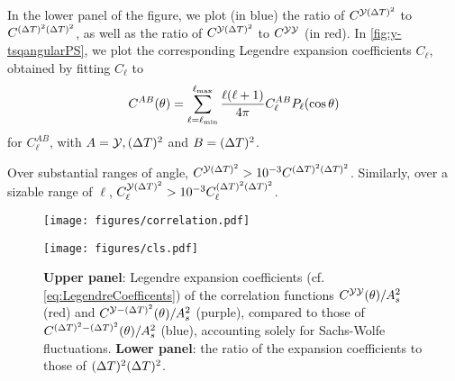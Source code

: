 \documentclass[fleqn,usenatbib]{mnras}
\begin{document}
    In the lower panel of the figure, we plot (in blue) the ratio of
    $C^{\Yd(\DeltaT)^2}$ to $C^{({\Delta T})^2(\Delta T)^2}$, as well as the ratio
    of $C^{\Yd(\DeltaT)^2}$ to $C^{\Yd\Yd}$ (in red).  In
    \autoref{fig:y-tsqangularPS}, we plot the corresponding Legendre expansion
    coefficients $C_\ell$, obtained by fitting $C_\ell$ to
    \begin{equation} \label{eq:LegendreCoefficents}
        C^{AB}(\theta) = \sum\limits_{\ell=\ell_{\rm min}}^{\ell_{\rm max}} 
            \frac{\ell(\ell+1)}{4\pi}C^{AB}_\ell P_\ell(\cos\theta)
    \end{equation}
    for $C^{AB}_\ell$, with $A=\mathcal{Y},({\Delta T})^2$ and $B=({\Delta T})^2$.
    
    Over substantial ranges of angle, $C^{\mathcal{Y}({\Delta T})^2}>
    10^{-3}C^{({\Delta T})^2({\Delta T})^2}$.  Similarly, over a sizable range of
    $\ell$, $C_\ell^{\mathcal{Y}({\Delta T})^2} > 10^{-3}C_\ell^{(\Delta T)^2({\Delta T})^2}$.

    \begin{figure*}
    \begin{minipage}[c]{0.45\linewidth}
        \centering
        \vspace{15pt}
        \texttt{[image: figures/correlation.pdf]}
        \vspace{-15pt}
        \caption{%
            \textbf{Upper panel}: Reduced dimensionless angular correlation
            functions of $Y$, $C^{\mcal{YY}}(\theta)/A_s^2$ (red), between $Y$
            and $(\DeltaT)^2$, $C^{\Yd(\DeltaT)^2}(\theta)/A_s^2$ (purple), and
            between the Sachs-Wolfe contributions to $(\DeltaT)^2$,
            $C^{(\DeltaT)^2(\DeltaT)^2}(\theta)/A_s^2$ (blue), where $\theta$ is
            the angle between sky locations of the two quantities being
            correlated.  \textbf{Lower panel}: the ratio of $C^{\Yd(\DeltaT)^2}$
            to $C^{(\DeltaT)^2(\DeltaT)^2}$ (blue) and $C^{\Yd(\DeltaT)^2}$ to
            $C^{\Yd\Yd}$ (red).
        }
        \label{fig:y-tsqcorrelation}

    \end{minipage}
    \hfill
    \begin{minipage}[c]{0.45\linewidth}
        \texttt{[image: figures/cls.pdf]}
        \vspace{-15pt}
        \caption{%
            \textbf{Upper panel}: Legendre expansion coefficients (cf.
            \eqref{eq:LegendreCoefficents}) of the correlation functions
            $C^{\mcal{YY}}(\theta)/A_s^2$ (red) and
            $C^{\mathcal{Y}-({\Delta T})^2}(\theta)/A_s^2$ (purple), compared to those of
            $C^{({\Delta T})^2-({\Delta T})^2}(\theta)/A_s^2$ (blue), accounting
            solely for Sachs-Wolfe fluctuations.  \textbf{Lower panel}: the
            ratio of the expansion coefficients to those of
            $({\Delta T})^2({\Delta T})^2$.%
        }
        \label{fig:y-tsqangularPS}
        \centering

    \end{minipage}
    \end{figure*}
\end{document}
